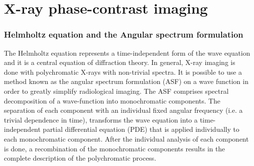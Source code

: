 \documentclass[10pt, a4paper, singlespacing]{report}
\begin{document}
\section{X-ray phase-contrast imaging}\label{PC}

\subsubsection{Helmholtz equation and the Angular spectrum formulation}\label{ASF}
The Helmholtz equation represents a time-independent form of the wave equation and it is a central equation of diffraction theory\cite{CH49}\cite{Pags2006}.
In general, X-ray imaging is done with polychromatic X-rays with non-trivial spectra\cite{CH49}. It is possible to use a method known as the angular spectrum formulation (ASF) on a wave function in order to greatly simplify radiological imaging. The ASF comprises spectral decomposition of a wave-function into monochromatic components. The separation of each component with an individual fixed angular frequency (i.e. a trivial dependence in time), transforms the wave equation into a time-independent partial differential equation (PDE) that is applied individually to each monochromatic component. After the individual analysis of each component is done, a recombination of the monochromatic components results in the complete description of the polychromatic process\cite{CH49}\cite{Pags2006}.
\end{document}
